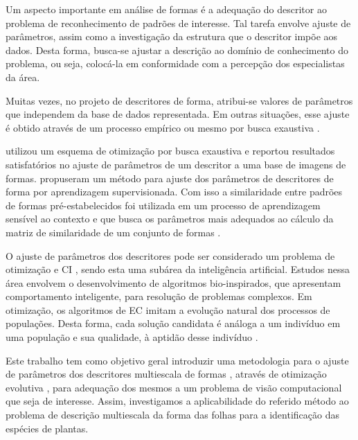 
Um aspecto importante em análise de formas é a adequação do descritor ao problema de reconhecimento de padrões de interesse. Tal tarefa envolve ajuste de parâmetros, assim como a investigação da estrutura que o descritor impõe aos dados. Desta forma, busca-se ajustar a descrição ao domínio de conhecimento do problema, ou seja, colocá-la em conformidade com a percepção dos especialistas da área. 

Muitas vezes, no projeto de descritores de forma, atribui-se valores de parâmetros que independem da base de dados representada. Em outras situações, esse ajuste é obtido através de um processo empírico ou mesmo por busca exaustiva \cite{mokhtarian1998robust, Ling:2007:SCU:1191552.1191806, Wang2012134}.

  utilizou um esquema de otimização por busca exaustiva e reportou resultados satisfatórios no ajuste de parâmetros de um descritor a uma base de imagens de formas.   propuseram um método para ajuste dos parâmetros de descritores de forma por aprendizagem supervisionada. Com isso a similaridade entre padrões de formas pré-estabelecidos foi utilizada em um processo de aprendizagem sensível ao contexto e que busca os parâmetros mais adequados ao cálculo da matriz de similaridade de um conjunto de formas \cite{4815272}.

O ajuste de parâmetros dos descritores pode ser considerado um problema de otimização e \ac{CI} \cite{Andries:2007}, sendo esta uma subárea da inteligência artificial. Estudos nessa área envolvem o desenvolvimento de algoritmos bio-inspirados, que apresentam comportamento inteligente, para resolução de problemas complexos. Em otimização, os algoritmos de \ac{EC} imitam a evolução natural dos processos de populações. Desta forma, cada solução candidata é análoga a um indivíduo em uma população e sua qualidade, à aptidão desse indivíduo \cite{Eiben:2015}.

Este trabalho tem como objetivo geral introduzir uma metodologia para o ajuste de parâmetros dos descritores multiescala de formas \cite{Costa:2009}, através de otimização evolutiva \cite{Andries:2007}, para adequação dos mesmos a um problema de visão computacional que seja de interesse. Assim, investigamos a aplicabilidade do referido método ao problema de descrição multiescala da forma das folhas para a identificação das espécies de plantas. 

